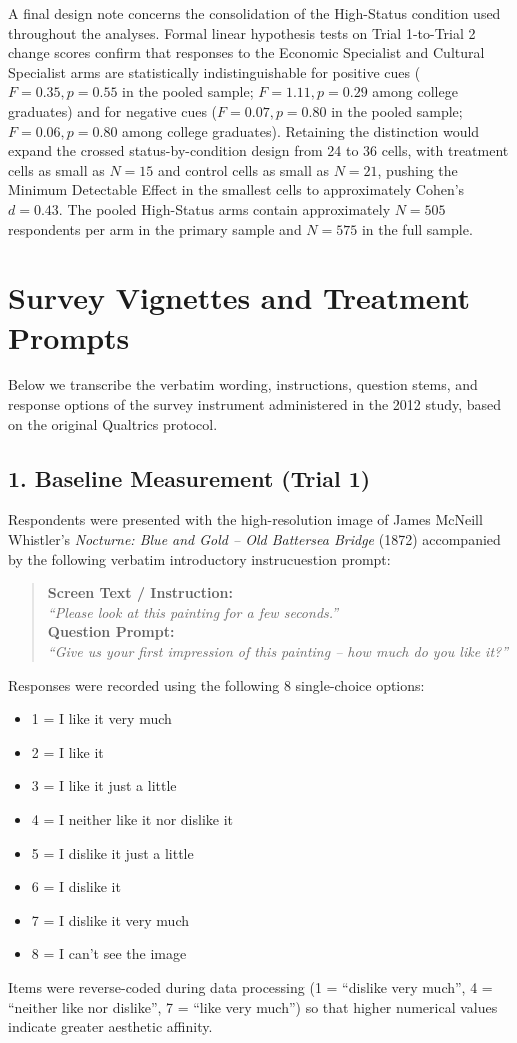 \documentclass[12pt, letterpaper]{article}
\begin{document}
A final design note concerns the consolidation of the High-Status condition used throughout the analyses. Formal linear hypothesis tests on Trial 1-to-Trial 2 change scores confirm that responses to the Economic Specialist and Cultural Specialist arms are statistically indistinguishable for positive cues ($F = 0.35, p = 0.55$ in the pooled sample; $F = 1.11, p = 0.29$ among college graduates) and for negative cues ($F = 0.07, p = 0.80$ in the pooled sample; $F = 0.06, p = 0.80$ among college graduates). Retaining the distinction would expand the crossed status-by-condition design from 24 to 36 cells, with treatment cells as small as $N = 15$ and control cells as small as $N = 21$, pushing the Minimum Detectable Effect in the smallest cells to approximately Cohen's $d = 0.43$. The pooled High-Status arms contain approximately $N = 505$ respondents per arm in the primary sample and $N = 575$ in the full sample.

\section{Survey Vignettes and Treatment Prompts}
\label{sec:appendix_vignettes}
Below we transcribe the verbatim wording, instructions, question stems, and response options of the survey instrument administered in the 2012 study, based on the original Qualtrics protocol.

\subsection*{1. Baseline Measurement (Trial 1)}
Respondents were presented with the high-resolution image of James McNeill Whistler's \textit{Nocturne: Blue and Gold -- Old Battersea Bridge} (1872) accompanied by the following verbatim introductory instrucuestion prompt:
\begin{quote}
\textbf{Screen Text / Instruction:} \\
\textit{``Please look at this painting for a few seconds.''} \\[4pt]
\textbf{Question Prompt:} \\
\textit{``Give us your first impression of this painting -- how much do you like it?''}
\end{quote}
Responses were recorded using the following 8 single-choice options:
\begin{itemize}
    \item 1 = I like it very much
    \item 2 = I like it
    \item 3 = I like it just a little
    \item 4 = I neither like it nor dislike it
    \item 5 = I dislike it just a little
    \item 6 = I dislike it
    \item 7 = I dislike it very much
    \item 8 = I can't see the image
\end{itemize}
Items were reverse-coded during data processing (1 = ``dislike very much'', 4 = ``neither like nor dislike'', 7 = ``like very much'') so that higher numerical values indicate greater aesthetic affinity.
\end{document}
